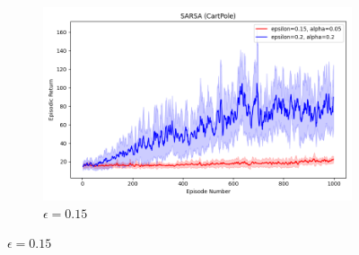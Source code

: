 \documentclass[11pt, a4]{article}
\begin{document}
\begin{figure}[h]
\begin{subfigure}[h]{0.3\textwidth}
					\includegraphics[width=\textwidth]{../plots/sarsa_0.05_0.15vs0.2_0.2.png}
					\caption{$\epsilon = 0.15$}
				\end{subfigure}
				
				\vspace{0.1cm} %
				

\end{figure}
\end{document}
